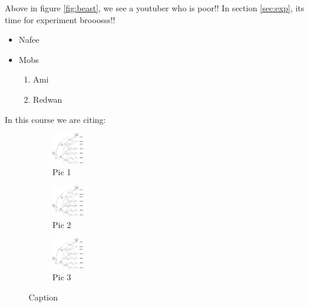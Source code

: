 \documentclass[28pt,a4paper]{article}
\begin{document}
Above in figure \ref{fig:beast}, we see a youtuber who is poor!!
In section \ref{sec:exp}, its time for experiment brooosss!!

\begin{itemize}
    \item Nafee
    \item Mobs
    \begin{enumerate}
        \item Ami
        \item Redwan
    \end{enumerate}
\end{itemize}

In this course we are citing:
\cite{book1}
\cite{book2}

\begin{figure}
    \centering
    \begin{subfigure}[b]{width=0.15\textwidth}
    \centering
    \includegraphics[width=0.15\textwidth]{img.jpg}
    \caption{Pic 1}
    \end{subfigure}
    
    \begin{subfigure}[b]{width=0.15\textwidth}
    \centering
    \includegraphics[width=0.15\textwidth]{img.jpg}
    \caption{Pic 2}
    \end{subfigure}
    
    \begin{subfigure}[b]{width=0.15\textwidth}
    \centering
    \includegraphics[width=0.15\textwidth]{img.jpg}
    \caption{Pic 3}
    \end{subfigure}
    
    \caption{Caption}
    \label{fig:my_label}
\end{figure}



\printbibliography
\end{document}

